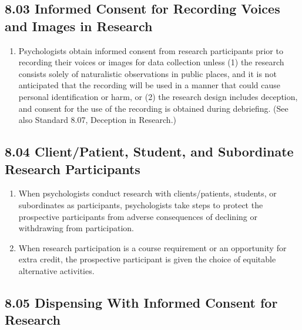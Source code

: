 \subsection{8.03 Informed Consent for Recording Voices and Images in Research}


\begin{enumerate}
\item Psychologists obtain informed consent from research participants prior to recording their voices or images for data collection unless (1) the research consists solely of naturalistic observations in public places, and it is not anticipated that the recording will be used in a manner that could cause personal identification or harm, or (2) the research design includes deception, and consent for the use of the recording is obtained during debriefing. (See also Standard 8.07, Deception in Research.)

\end{enumerate}




\subsection{8.04 Client/Patient, Student, and Subordinate Research Participants}




\begin{enumerate}


\item When psychologists conduct research with clients/patients, students, or subordinates as participants, psychologists take steps to protect the prospective participants from adverse consequences of declining or withdrawing from participation.




\item When research participation is a course requirement or an opportunity for extra credit, the prospective participant is given the choice of equitable alternative activities.


\end{enumerate}




\subsection{8.05 Dispensing With Informed Consent for Research}





